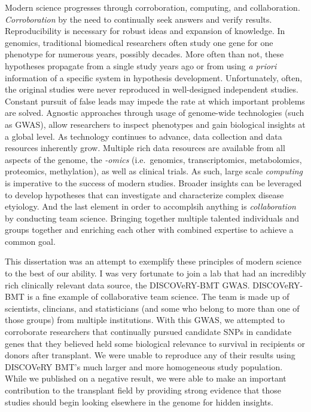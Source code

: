 \documentclass[]{DissertateOSU}
\begin{document}
\doublespacing

Modern science progresses through corroboration, computing, and
collaboration. \emph{Corroboration} by the need to continually seek
answers and verify results. Reproducibility is necessary for robust
ideas and expansion of knowledge. In genomics, traditional biomedical
researchers often study one gene for one phenotype for numerous years,
possibly decades. More often than not, these hypotheses propagate from a
single study years ago or from using \emph{a priori} information of a
specific system in hypothesis development. Unfortunately, often, the
original studies were never reproduced in well-designed independent
studies. Constant pursuit of false leads may impede the rate at which
important problems are solved. Agnostic approaches through usage of
genome-wide technologies (such as GWAS), allow researchers to inspect
phenotypes and gain biological insights at a global level. As technology
continues to advance, data collection and data resources inherently
grow. Multiple rich data resources are available from all aspects of the
genome, the \emph{-omics} (i.e.~genomics, transcriptomics, metabolomics,
proteomics, methylation), as well as clinical trials. As such, large
scale \emph{computing} is imperative to the success of modern studies.
Broader insights can be leveraged to develop hypotheses that can
investigate and characterize complex disease etyiology. And the last
element in order to accomplsih anything is \emph{collaboration} by
conducting team science. Bringing together multiple talented individuals
and groups together and enriching each other with combined expertise to
achieve a common goal.

This dissertation was an attempt to exemplify these principles of modern
science to the best of our ability. I was very fortunate to join a lab
that had an incredibly rich clinically relevant data source, the
DISCOVeRY-BMT GWAS. DISCOVeRY-BMT is a fine example of collaborative
team science. The team is made up of scientists, clincians, and
statisticians (and some who belong to more than one of those groups)
from multiple institutions. With this GWAS, we attempted to corroborate
researchers that continually pursued candidate SNPs in candidate genes
that they believed held some biological relevance to survival in
recipients or donors after transplant. We were unable to reproduce any
of their results using DISCOVeRY BMT's much larger and more homogeneous
study population. While we published on a negative result, we were able
to make an important contribution to the transplant field by providing
strong evidence that those studies should begin looking elsewhere in the
genome for hidden insights.
\end{document}
